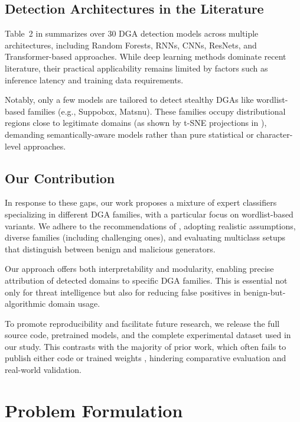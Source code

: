 \documentclass[a4paper]{llncs}
\begin{document}
\subsection{Detection Architectures in the Literature}

Table~2 in \cite{cebere2024down} summarizes over 30 DGA detection models across multiple architectures, including Random Forests, RNNs, CNNs, ResNets, and Transformer-based approaches. While deep learning methods dominate recent literature, their practical applicability remains limited by factors such as inference latency and training data requirements.

Notably, only a few models are tailored to detect stealthy DGAs like wordlist-based families (e.g., Suppobox, Matsnu). These families occupy distributional regions close to legitimate domains (as shown by t-SNE projections in \cite{cebere2024down}), demanding semantically-aware models rather than pure statistical or character-level approaches.

\subsection{Our Contribution}

In response to these gaps, our work proposes a mixture of expert classifiers specializing in different DGA families, with a particular focus on wordlist-based variants. We adhere to the recommendations of \cite{cebere2024down}, adopting realistic assumptions, diverse families (including challenging ones), and evaluating multiclass setups that distinguish between benign and malicious generators.

Our approach offers both interpretability and modularity, enabling precise attribution of detected domains to specific DGA families. This is essential not only for threat intelligence but also for reducing false positives in benign-but-algorithmic domain usage.

To promote reproducibility and facilitate future research, we release the full source code, pretrained models, and the complete experimental dataset used in our study. This contrasts with the majority of prior work, which often fails to publish either code or trained weights \cite{cebere2024down}, hindering comparative evaluation and real-world validation.



\section{Problem Formulation}
\end{document}
